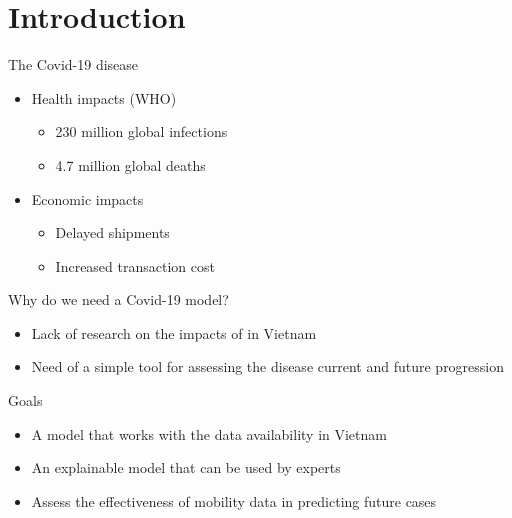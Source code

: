 \section{Introduction}

\begin{frame}{The Covid-19 disease}
\begin{itemize}
    \item<1-> Health impacts (WHO)
    \begin{itemize}
        \item 230 million global infections
        \item 4.7 million global deaths
    \end{itemize}

    \item<2-> Economic impacts
    \begin{itemize}
        \item Delayed shipments
        \item Increased transaction cost
    \end{itemize}
\end{itemize}
\end{frame}

\begin{frame}{Why do we need a Covid-19 model?}
\begin{itemize}
    \item<1-> Lack of research on the impacts of  in Vietnam
    \item<2-> Need of a simple tool for assessing the disease current and future progression
\end{itemize}
\end{frame}

\begin{frame}{Goals}
\begin{itemize}
    \item<1-> A model that works with the data availability in Vietnam
    \item<2-> An explainable model that can be used by experts
    \item<3-> Assess the effectiveness of mobility data in predicting future cases
\end{itemize}
\end{frame}